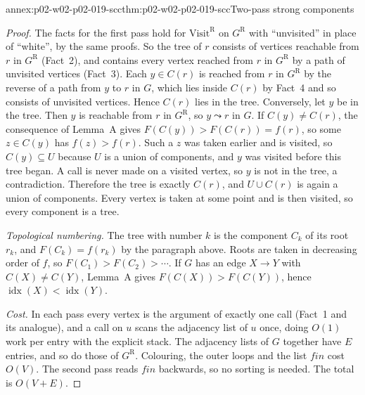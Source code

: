 \begin{annexitem}{annex:p02-w02-p02-019-scc}{thm:p02-w02-p02-019-scc}{Two-pass strong components}
\begin{proof}
The facts for the first pass hold for \(\mathrm{Visit}^{\mathrm R}\) on
\(G^{\mathrm R}\) with ``unvisited'' in place of ``white'', by the same proofs.
So the tree of \(r\) consists of vertices reachable from \(r\) in
\(G^{\mathrm R}\) (Fact~2), and contains every vertex reached from \(r\) in
\(G^{\mathrm R}\) by a path of unvisited vertices (Fact~3).  Each \(y\in C(r)\)
is reached from \(r\) in \(G^{\mathrm R}\) by the reverse of a path from \(y\)
to \(r\) in \(G\), which lies inside \(C(r)\) by Fact~4 and so consists of
unvisited vertices.  Hence \(C(r)\) lies in the tree.  Conversely, let \(y\)
be in the tree.  Then \(y\) is reachable from \(r\) in \(G^{\mathrm R}\), so
\(y\leadsto r\) in \(G\).  If \(C(y)\neq C(r)\), the consequence of Lemma~A
gives \(F(C(y))>F(C(r))=f(r)\), so some \(z\in C(y)\) has \(f(z)>f(r)\).
Such a \(z\) was taken earlier and is visited, so \(C(y)\subseteq U\) because
\(U\) is a union of components, and \(y\) was visited before this tree began.
A call is never made on a visited vertex, so \(y\) is not in the tree, a
contradiction.  Therefore the tree is exactly \(C(r)\), and
\(U\cup C(r)\) is again a union of components.  Every vertex is taken at some
point and is then visited, so every component is a tree.

\emph{Topological numbering.}  The tree with number \(k\) is the component
\(C_k\) of its root \(r_k\), and \(F(C_k)=f(r_k)\) by the paragraph above.
Roots are taken in decreasing order of \(f\), so \(F(C_1)>F(C_2)>\cdots\).
If \(G\) has an edge \(X\to Y\) with \(C(X)\neq C(Y)\), Lemma~A gives
\(F(C(X))>F(C(Y))\), hence \(\operatorname{idx}(X)<\operatorname{idx}(Y)\).

\emph{Cost.}  In each pass every vertex is the argument of exactly one call
(Fact~1 and its analogue), and a call on \(u\) scans the adjacency list of
\(u\) once, doing \(O(1)\) work per entry with the explicit stack.  The
adjacency lists of \(G\) together have \(E\) entries, and so do those of
\(G^{\mathrm R}\).  Colouring, the outer loops and the list \(\mathit{fin}\)
cost \(O(V)\).  The second pass reads \(\mathit{fin}\) backwards, so no sorting
is needed.  The total is \(O(V+E)\).
\end{proof}
\end{annexitem}

